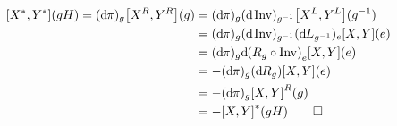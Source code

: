 \begin{beweis}
\begin{enumerate}[1)]
		\begin{align}
			\benbrace*{X^*,Y^*}(gH) = (\mathd \pi)_g \benbrace*{X^R,Y^R}(g) &= (\mathd \pi)_g (\mathd \Inv)_{g^{-1}} \benbrace*{X^L,Y^L}(g^{-1}) \\
			&= (\mathd \pi)_g (\mathd \Inv)_{g^{-1}} (\mathd L_{g^{-1}})_e \benbrace*{X,Y}(e) \\
			&= (\mathd \pi)_g \mathd \enbrace*{R_g \circ \Inv}_e [X,Y](e) \\
			&= - (\mathd \pi)_g (\mathd R_g) \benbrace*{X,Y}(e) \\
			&= - (\mathd \pi)_g \benbrace*{X,Y}^R(g) \\
			&= - \benbrace*{X,Y}^*(gH) \qedhere
		\end{align}
	\end{enumerate}
\end{beweis}

